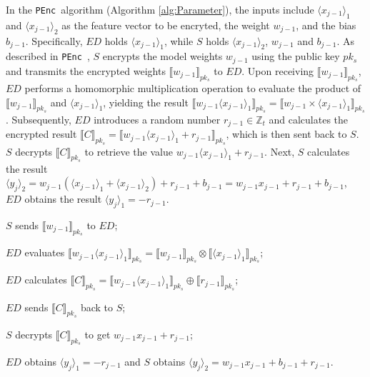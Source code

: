 \documentclass[conference]{IEEEtran}
\newcommand{\PEnc}{\texttt{PEnc}}
\begin{document}
In the \PEnc~algorithm (Algorithm \ref{alg:Parameter}), the inputs include $\langle x_{j-1}\rangle_1$ and $\langle x_{j-1}\rangle_2$ as the feature vector to be encryted, the weight $w_{j-1}$, and the bias $b_{j-1}$. Specifically, $ED$ holds $\langle x_{j-1}\rangle_1$, while $S$ holds $\langle x_{j-1}\rangle_2$, $w_{j-1}$ and $b_{j-1}$. As described in \PEnc~, $S$ encrypts the model weights $w_{j-1}$ using the public key $pk_s$ and transmits the encrypted weights $\llbracket w_{j-1} \rrbracket_{pk_s}$ to $ED$. Upon receiving $\llbracket w_{j-1} \rrbracket_{pk_s}$, $ED$ performs a homomorphic multiplication operation to evaluate the product of $\llbracket w_{j-1} \rrbracket_{pk_s}$ and $\langle x_{j-1} \rangle_1$, yielding the result $\llbracket w_{j-1} \langle x_{j-1} \rangle_1\rrbracket_{pk_s} = \llbracket w_{j-1} \times \langle x_{j-1} \rangle_1 \rrbracket_{pk_s}$. Subsequently, $ED$ introduces a random number $r_{j-1}\in \mathbb{Z}_t$ and calculates the encrypted result $\llbracket C \rrbracket_{pk_s}=\llbracket w_{j-1} \langle x_{j-1} \rangle_1 + r_{j-1} \rrbracket_{pk_s}$, which is then sent back to $S$. $S$ decrypts $\llbracket C \rrbracket_{pk_s}$ to retrieve the value $w_{j-1}\langle x_{j-1} \rangle_1+r_{j-1}$. Next, $S$ calculates the result $\langle y_j\rangle_2= w_{j-1}(\langle x_{j-1} \rangle_1 + \langle x_{j-1} \rangle_2)+r_{j-1}+b_{j-1}=w_{j-1}x_{j-1}+r_{j-1}+b_{j-1}$, $ED$ obtains the result $\langle y_j\rangle_1=-r_{j-1}$. 
\begin{algorithm}[htbp]
	\caption{\PEnc$(\langle x_{j-1} \rangle_1,\langle x_{j-1} \rangle_2,w_{j-1},b_{j-1}) \rightarrow (\langle y_j\rangle_1, \langle y_j\rangle_2)$}
    \label{alg:Parameter}
    \LinesNumbered
     $S$ sends $\llbracket w_{j-1}\rrbracket_{pk_s}$ to $ED$;
    
     $ED$ evaluates $\llbracket w_{j-1}\langle x_{j-1} \rangle_1 \rrbracket_{pk_s} = \llbracket w_{j-1} \rrbracket_{pk_s} \otimes \llbracket \langle x_{j-1} \rangle_1 \rrbracket_{pk_s}$;
    
     $ED$  calculates $\llbracket C\rrbracket_{pk_s} = \llbracket w_{j-1}\langle x_{j-1} \rangle_1 \rrbracket_{pk_s} \oplus \llbracket r_{j-1} \rrbracket_{pk_s}$;
     
     $ED$ sends $\llbracket C\rrbracket_{pk_s}$ back to $S$;
    
     $S$ decrypts $\llbracket C\rrbracket_{pk_s}$ to get $w_{j-1} x_{j-1} + r_{j-1}$;
     
     $ED$ obtains $\langle y_j\rangle_1=-r_{j-1}$ and $S$ obtains $\langle y_j\rangle_2 = w_{j-1} x_{{j-1}}  + b_{j-1} + r_{j-1}$.
\end{algorithm}
\end{document}
